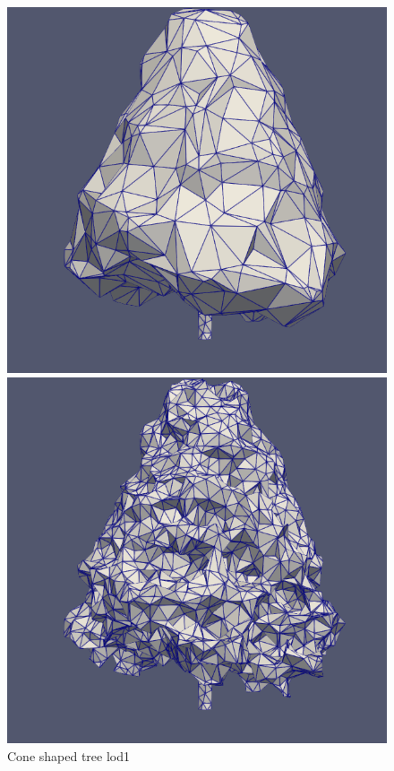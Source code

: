 \documentclass[12pt]{article}
\begin{document}
\begin{figure}[H]
    \centering
    \begin{minipage}{0.30\textwidth}
        \centering
        \includegraphics[width=1\textwidth]{images/tree-cone_lod1.png}
        \caption{Cone shaped tree lod1}
    \end{minipage}
    \begin{minipage}{0.30\textwidth}
        \centering
        \includegraphics[width=1\textwidth]{images/tree-cone_lod2.png}

\end{minipage}
\end{figure}
\end{document}

